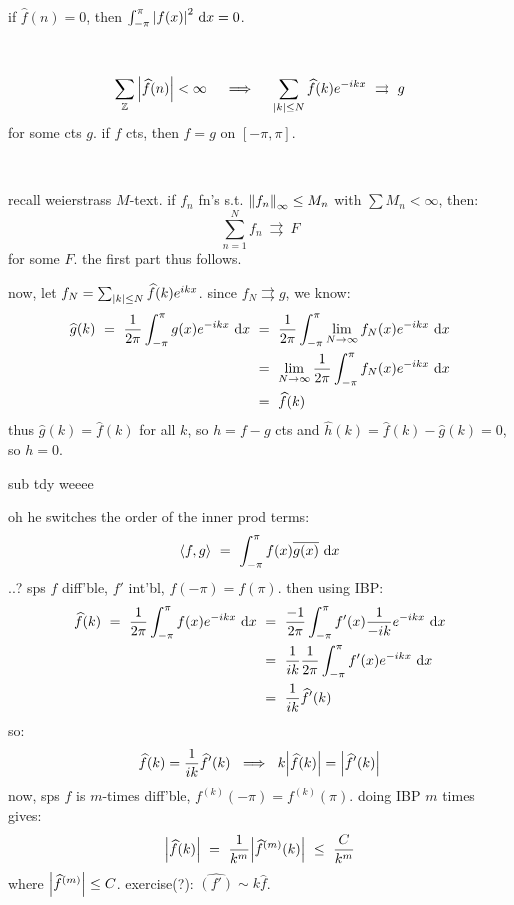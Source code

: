 \begin{pf}
	if $\hat{f}(n)=0$, then $\int_{-\pi}^{\pi}\abs{f(x)}^{2}\textrm{ d} x = 0$.
\end{pf} \

\begin{crll}
	\begin{equation*}
		\sum_{\bZ}\abs{\hat{f}(n)}<\infty \quad \implies \quad
		\sum_{\abs{k}\leq N}\hat{f}(k)e^{-ikx} \ \rightrightarrows \ g
	\end{equation*}
	for some cts $g$.
	if $f$ cts, then $f=g$ on $[-\pi,\pi]$.
\end{crll} \

\begin{pf}
	recall weierstrass $M$-text.
	if $f_{n}$ fn's s.t. $\left\|f_{n}\right\|_{\infty}\leq M_{n}$ with $\sum M_{n}<\infty$, then:
	\begin{equation*}
		\sum_{n=1}^{N}f_{n} \ \rightrightarrows \ F
	\end{equation*}
	for some $F$. the first part thus follows.

	now, let $f_{N}=\sum_{\abs{k}\leq N}\widehat{f}(k)e^{ikx}$.
	since $f_{N}\rightrightarrows g$, we know:
	\begin{align*}
		\hat{g}(k) \ = \ \frac{1}{2\pi}\int_{-\pi}^{\pi}g(x)e^{-ikx}\di x
		& \ = \ \frac{1}{2\pi}\int_{-\pi}^{\pi}\lim_{N\sto\infty}f_{N}(x)e^{-ikx}\di x \\
		& \ = \ \lim_{N\sto\infty}\frac{1}{2\pi}\int_{-\pi}^{\pi}f_{N}(x)e^{-ikx}\di x \\
		& \ = \ \hat{f}(k)
	\end{align*}
	thus $\hat{g}(k)=\hat{f}(k)$ for all $k$, so $h=f-g$ cts and
	$\hat{h}(k)=\hat{f}(k)-\hat{g}(k)=0$, so $h=0$.
\end{pf}

sub tdy weeee

oh he switches the order of the inner prod terms:
\begin{equation*}
	\ang{f,g} \ = \ \int_{-\pi}^{\pi}f(x)\bar{g(x)}\di x
\end{equation*}
..? sps $f$ diff'ble, $f'$ int'bl, $f(-\pi)=f(\pi)$. then using IBP:
\begin{align*}
	\hat{f}(k) \ = \ \frac{1}{2\pi}\int_{-\pi}^{\pi}f(x)e^{-ikx}\di x
	& \ = \ \frac{-1}{2\pi}\int_{-\pi}^{\pi}f'(x)\frac{1}{-ik}e^{-ikx}\di x \\
	& \ = \ \frac{1}{ik}\frac{1}{2\pi}\int_{-\pi}^{\pi}f'(x)e^{-ikx}\di x \\
	& \ = \ \frac{1}{ik}\hat{f}'(k)
\end{align*}
so:
\begin{equation*}
	\widehat{f}(k) = \frac{1}{ik}\widehat{f}'(k) \ \implies \ k\abs{\widehat{f}(k)} = \abs{\widehat{f}'(k)}
\end{equation*}
now, sps $f$ is $m$-times diff'ble, $f^{(k)}(-\pi)=f^{(k)}(\pi)$.
doing IBP $m$ times gives:
\begin{equation*}
	\abs{\hat{f}(k)} \ = \ \frac{1}{k^{m}}\abs{\hat{f}^{(m)}(k)} \ \leq \ \frac{C}{k^{m}}
\end{equation*}
where $\abs{\widehat{f}^{(m)}}\leq C$.
exercise(?): $\hat{(f')}\sim k\hat{f}$.
